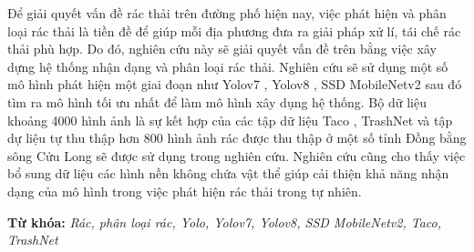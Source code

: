 \documentclass[./thesis.tex]{subfiles}
\begin{document}

{\fontsize{13}{12} \selectfont
Để giải quyết vấn đề rác thải trên đường phố hiện nay, việc phát hiện và phân loại rác thải là tiền đề để giúp mỗi địa phương đưa ra giải pháp xử lí, tái chế rác thải phù hợp.
Do đó, nghiên cứu này sẽ giải quyết vấn đề trên bằng việc xây dựng hệ thống nhận dạng và phân loại rác thải. Nghiên cứu sẽ sử dụng một số mô hình phát hiện một giai đoạn
như Yolov7 \cite{wang2022yolov7}, Yolov8 \cite{Yolov8}, SSD MobileNetv2 \cite{Liu_2016} \cite{sandler2019mobilenetv2} sau đó tìm ra mô hình tối ưu nhất để làm mô hình xây dụng hệ thống.
Bộ dữ liệu khoảng 4000 hình ảnh là sự kết hợp của các tập dữ liệu Taco \cite{proença2020taco}, TrashNet \cite{yang2016classification} và tập dự liệu tự thu thập hơn 800 hình ảnh rác được thu thập ở một số tỉnh Đồng bằng sông Cửu Long sẽ được sử dụng trong nghiên cứu.
Nghiên cứu cũng cho thấy việc bổ sung dữ liệu các hình nền không chứa vật thể giúp cải thiện khả năng nhận dạng của mô hình trong việc phát hiện rác thải trong tự nhiên.
}
\bigskip



{\bf Từ khóa:} \textit{Rác, phân loại rác, Yolo, Yolov7, Yolov8, SSD MobileNetv2, Taco, TrashNet}
\end{document}
